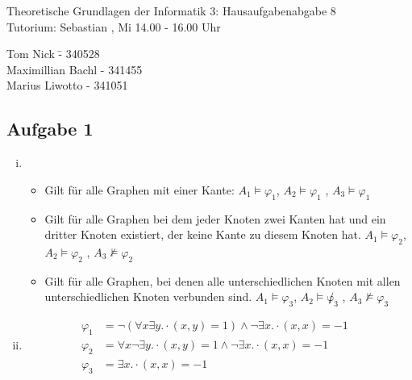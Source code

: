 \documentclass[a4paper,10pt]{article}
\begin{document}
\begin{center}
\Large{Theoretische Grundlagen der Informatik 3: Hausaufgabenabgabe 8} \\
\large{Tutorium: Sebastian , Mi 14.00 - 16.00 Uhr}
\end{center}
\begin{tabbing}
Tom Nick \hspace{2cm}\= - 340528\\
Maximillian Bachl \> - 341455 \\
Marius Liwotto\> -  341051
\end{tabbing}
\subsection{Aufgabe 1}
\begin{enumerate}[(i)]
	\item 
	\begin{itemize}
		\item 	Gilt für alle Graphen mit einer Kante: $A_1 \vDash \varphi_1$, $A_2 \vDash \varphi_1$ , $A_3 \vDash \varphi_1$
		\item 	Gilt für alle Graphen bei dem jeder Knoten zwei Kanten hat und ein dritter Knoten existiert, der keine Kante zu diesem Knoten hat.
			$A_1 \vDash \varphi_2$, $A_2 \vDash \varphi_2$ , $A_3 \not\vDash \varphi_2$
		\item  	Gilt für alle Graphen, bei denen alle unterschiedlichen Knoten mit allen unterschiedlichen Knoten verbunden sind.
			$A_1 \vDash \varphi_3$, $A_2 \vDash \not\varphi_3$ , $A_3 \not\vDash \varphi_3$
	\end{itemize}
	\item 
	\begin{align*}
		\varphi_1 &= \lnot(\forall x \exists y. \cdot( x, y ) = 1) \land \lnot \exists x. \cdot(x,x) = -1 &\\
		\varphi_2 &= \forall x \lnot \exists y. \cdot( x, y ) = 1 \land \lnot \exists x. \cdot(x,x) = -1& \\
		\varphi_3 &= \exists x. \cdot(x,x) = -1&
	\end{align*}
	
\end{enumerate}
\end{document}
